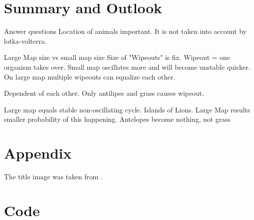 \documentclass[11pt]{article}
\begin{document}
\section{Summary and Outlook}
Answer questions
Location of animals important. It is not taken into account by lotka-volterra.

Large Map size vs small map size
Size of "Wipeouts" is fix. Wipeout = one organism takes over. Small map oscillates more and will become unstable quicker. On large map multiple wipeouts can equalize each other.

Dependent of each other. 
Only antilipes and grass causes wipeout.

Large map equals stable non-oscillating cycle. 
Islands of Lions. Large Map results smaller probability of this happening. 
Antelopes become nothing, not grass


\appendix

\section{Appendix}
The title image was taken from \cite{titleImage}.

\section{Code}



\end{document}
